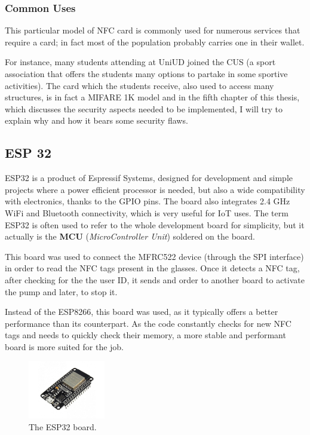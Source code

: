 \documentclass[target=bach,aauheader=,style=]{thud}
\begin{document}
\subsubsection{Common Uses}
This particular model of NFC card is commonly used for numerous services that require a card; in fact most of the population probably carries one in their wallet.

For instance, many students attending at UniUD joined the CUS (a sport association that offers the students many options to partake in some sportive activities). The card which the students receive, also used to access many structures, is in fact a MIFARE 1K model and in the fifth chapter of this thesis, which discusses the security aspects needed to be implemented, I will try to explain why and how it bears some security flaws.


\subsection{ESP 32}
ESP32 is a product of Espressif Systems, designed for development and simple projects where a power efficient processor is needed, but also a wide compatibility with electronics, thanks to the GPIO pins. The board also integrates 2.4 GHz WiFi and Bluetooth connectivity, which is very useful for IoT uses.
The term ESP32 is often used to refer to the whole development board for simplicity, but it actually is the \textbf{MCU} (\emph{MicroController Unit}) soldered on the board.

This board was used to connect the MFRC522 device (through the SPI interface) in order to read the NFC tags present in the glasses.
Once it detects a NFC tag, after checking for the the user ID, it sends and order to another board to activate the pump and later, to stop it.

Instead of the ESP8266, this board was used, as it typically offers a better performance than its counterpart. As the code constantly checks for new NFC tags and needs to quickly check their memory, a more stable and performant board is more suited for the job.

\begin{figure}[h!]
	\centering
	\includegraphics[width=0.3\textwidth]{esp32}
	\caption{The ESP32 board.}
	\label{fig:esp32}
\end{figure} 
\end{document}
